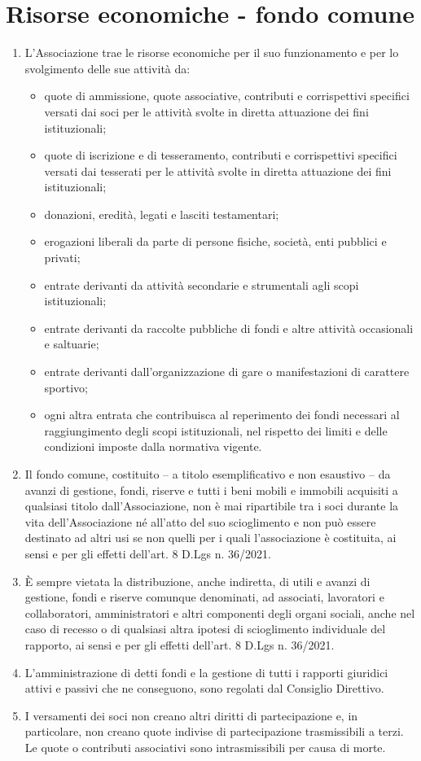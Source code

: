 \documentclass{djtsasddoc}
\begin{document}
	\section{Risorse economiche - fondo comune}
	\begin{enumerate}
		\item L'Associazione trae le risorse economiche per il suo funzionamento e per lo svolgimento delle sue attività da:
		\begin{itemize}
			\item quote di ammissione, quote associative, contributi e corrispettivi specifici versati dai soci per le attività svolte in diretta attuazione dei fini istituzionali;
			\item quote di iscrizione e di tesseramento, contributi e corrispettivi specifici versati dai tesserati per le attività svolte in diretta attuazione dei fini istituzionali;
			\item donazioni, eredità, legati e lasciti testamentari;
			\item erogazioni liberali da parte di persone fisiche, società, enti pubblici e privati;
			\item entrate derivanti da attività secondarie e strumentali agli scopi istituzionali;
			\item entrate derivanti da raccolte pubbliche di fondi e altre attività occasionali e saltuarie;
			\item entrate derivanti dall'organizzazione di gare o manifestazioni di carattere sportivo;
			\item ogni altra entrata che contribuisca al reperimento dei fondi necessari al raggiungimento degli scopi istituzionali, nel rispetto dei limiti e delle condizioni imposte dalla normativa vigente.
		\end{itemize}
		\item Il fondo comune, costituito – a titolo esemplificativo e non esaustivo – da avanzi di gestione, fondi, riserve e tutti i beni mobili e immobili  acquisiti a qualsiasi titolo dall'Associazione, non è mai ripartibile tra i soci durante la vita dell'Associazione né all'atto del suo scioglimento e non può essere destinato ad altri usi se non quelli per i quali l'associazione è costituita, ai sensi e per gli effetti dell'art. 8 D.Lgs n. 36/2021.
		\item È sempre vietata la distribuzione, anche indiretta, di utili e avanzi di gestione, fondi e riserve comunque denominati, ad associati, lavoratori e collaboratori, amministratori e altri componenti degli organi sociali, anche nel caso di recesso o di qualsiasi altra ipotesi di scioglimento individuale del rapporto, ai sensi e per gli effetti dell'art. 8 D.Lgs n. 36/2021.
		\item L'amministrazione di detti fondi e la gestione di tutti i rapporti giuridici attivi e passivi che ne conseguono, sono regolati dal Consiglio Direttivo.
		\item I versamenti dei soci non creano altri diritti di partecipazione e, in particolare, non creano quote indivise di partecipazione trasmissibili a terzi. Le quote o contributi associativi sono intrasmissibili per causa di morte.
	\end{enumerate}
	
\end{document}
